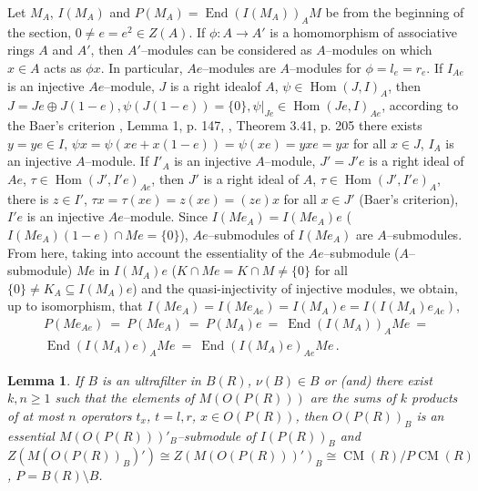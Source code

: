 \documentclass[a4paper,11pt]{article}
\newtheorem{lemma}[defi]{Lemma}
\DeclareMathOperator{\Hom}{Hom}
\DeclareMathOperator{\End}{End}
\DeclareMathOperator{\CM}{CM}
\begin{document}
Let $M_A$, $I(M_A)$ and ${P(M_A)=\End(I(M_A))_A M}$ be from the beginning 
of the section, 
${0\ne e=e^2\in Z(A)}$. If ${\phi: A\longrightarrow A'}$ is a homomorphism 
of associative rings $A$ and $A'$, then $A'$--modules can be considered as 
$A$--modules on which ${x\in A}$ acts as $\phi x$. In particular, 
$A e$--modules are $A$--modules for ${\phi=l_e=r_e}$. If 
$I_{A e}$ is an injective $A e$--module, $J$ is a right ideal\linebreak of $A$, 
${\psi\in \Hom(J, I)_A}$, then ${J=J e\oplus J(1-e), 
\psi(J (1-e))=\{0\}, \psi|_{J e}\in \Hom(J e, I)_{A e}}$, according to 
the Baer's criterion \cite{Lamb}, Lemma 1, p. 147, \cite{Fe}, 
Theorem 3.41, p. 205 
there exists\linebreak ${y=y e\in I}$, ${\psi x=\psi (x e+x (1-e))=\psi (x e)=y x e=y x}$ 
for all ${x\in J}$, $I_A$ is an injective $A$--module. If $I'_A$ is an 
injective $A$--module, $J'=J' e$ is a right ideal of $A e$, 
${\tau\in \Hom(J', I' e)_{A e}}$, then $J'$ is a right ideal of $A$, 
${\tau\in \Hom(J', I' e)_A}$, there is ${z\in I'}$, 
${\tau x=\tau (x e)=z (x e)=(z e) x}$ for all ${x\in J'}$ (Baer's criterion), 
$I' e$ is an injective $A e$--module. Since ${I(M e_A)=I(M e_A) e}$ 
(${I(M e_A) (1-e)\cap M e=\{0\}}$), $A e$--submodules of $I(M e_A)$ are 
$A$--submodules. From here, taking into account the essentiality of the 
$A e$--submodule ($A$--submodule) $M e$ in $I(M_A) e$ 
(${K\cap M e=K\cap M\ne \{0\}}$ for all ${\{0\}\ne K_A\subseteq I(M_A) e}$) 
and the quasi-injectivity of injective modules, we obtain, up to isomorphism, 
that ${I(M e_A)=I(M e_{A e})=I(M_A) e=I(I(M_A) e_{A e})}$, 
\begin{multline*}
P(M e_{A e})\ =\ P(M e_A)\ =\ P(M_A) e\ =\ \End(I(M_A))_A M e\ =
\\ 
\End(I(M_A) e)_A M e\ =\ \End(I(M_A) e)_{A e} M e\,.
\end{multline*}

\begin{lemma}
If $B$ is an ultrafilter in $B(R)$, ${\nu(B)\in B}$ or (and) there exist 
${k, n\geq 1}$ such that the elements of $M(O(P(R)))$ are the sums of $k$ 
products of at most $n$ operators $t_x$, 
${t=l, r}$, ${x\in O(P(R))}$, then $O(P(R))_B$ is an essential 
$M(O(P(R)))'_B$--submodule of $I(P(R))_B$ and 
${Z(M(O(P(R))_B)')\cong Z(M(O(P(R)))')_B\cong \CM(R)/P \CM(R)}$, 
${P=B(R)\setminus B}$.
\end{lemma}
\end{document}
